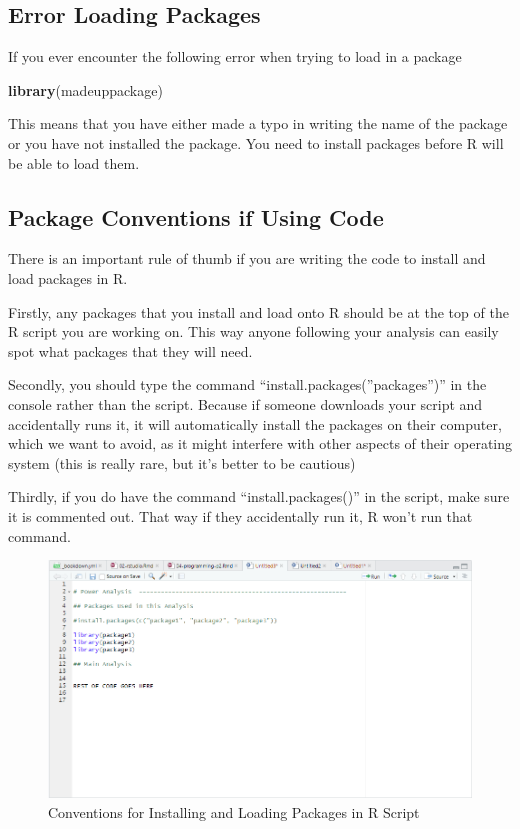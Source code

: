 \documentclass[
]{book}
\newenvironment{Shaded}{\begin{snugshade}}{\end{snugshade}}
\newcommand{\FunctionTok}[1]{\textcolor[rgb]{0.13,0.29,0.53}{\textbf{#1}}}
\newcommand{\NormalTok}[1]{#1}
\begin{document}
\hypertarget{error-loading-packages}{%
\subsection{Error Loading Packages}\label{error-loading-packages}}

If you ever encounter the following error when trying to load in a package

\begin{Shaded}
\begin{Highlighting}[]
\FunctionTok{library}\NormalTok{(madeuppackage)}
\end{Highlighting}
\end{Shaded}

This means that you have either made a typo in writing the name of the package or you have not installed the package. You need to install packages before R will be able to load them.

\hypertarget{package-conventions-if-using-code}{%
\subsection{Package Conventions if Using Code}\label{package-conventions-if-using-code}}

There is an important rule of thumb if you are writing the code to install and load packages in R.

Firstly, any packages that you install and load onto R should be at the top of the R script you are working on. This way anyone following your analysis can easily spot what packages that they will need.

Secondly, you should type the command ``install.packages(''packages'')'' in the console rather than the script. Because if someone downloads your script and accidentally runs it, it will automatically install the packages on their computer, which we want to avoid, as it might interfere with other aspects of their operating system (this is really rare, but it's better to be cautious)

Thirdly, if you do have the command ``install.packages()'' in the script, make sure it is commented out. That way if they accidentally run it, R won't run that command.

\begin{figure}
\centering
\includegraphics{img/04-packages-convention.png}
\caption{\label{fig:unnamed-chunk-158}Conventions for Installing and Loading Packages in R Script}
\end{figure}
\end{document}

